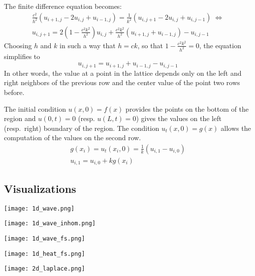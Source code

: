 The finite difference equation becomes:
\begin{gather*}
    \frac{c^2}{h^2}(u_{i+1,j}-2u_{i,j}+u_{i-1,j})=\frac{1}{k^2}(u_{i,j+1}-2u_{i,j}+u_{i,j-1}) \; \Leftrightarrow \\
    u_{i,j+1}=2\left(1-\frac{c^2k^2}{h^2}\right)u_{i,j}+\frac{c^2k^2}{h^2}(u_{i+1,j}+u_{i-1,j})-u_{i,j-1}
\end{gather*}
Choosing $h$ and $k$ in such a way that $h=ck$, so that $1 - \frac{c^2k^2}{h^2} = 0$, the equation simplifies to
\begin{equation*}
    u_{i,j+1}=u_{i+1,j}+u_{i-1,j}-u_{i,j-1}
\end{equation*}
In other words, the value at a point in the lattice depends only on the left and right neighbors of the previous row and the center value of the point two rows before.

The initial condition $u(x, 0) = f(x)$ provides the points on the bottom of the region and $u(0, t) = 0$ (resp. $u(L, t) = 0$) gives the values on the left (resp.\ right) boundary of the region. The condition $u_t(x, 0) = g(x)$ allows the computation of the values on the second row.
\begin{gather*}
    g(x_i)=u_t(x_i,0)=\frac{1}{k}(u_{i,1}-u_{i,0}) \\
    u_{i,1}=u_{i,0}+kg(x_i)
\end{gather*}

\subsection{Visualizations}

\texttt{[image: 1d\_wave.png]}

\texttt{[image: 1d\_wave\_inhom.png]}

\texttt{[image: 1d\_wave\_fs.png]}

\texttt{[image: 1d\_heat\_fs.png]}

\texttt{[image: 2d\_laplace.png]}